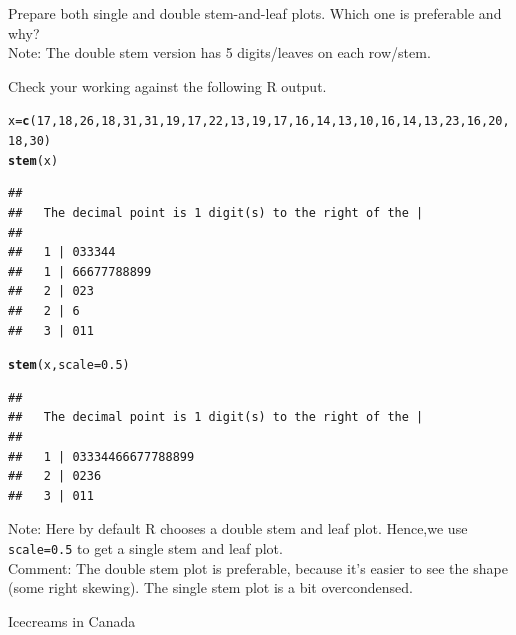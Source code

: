 \documentclass[bigtut]{tutorial}\usepackage[]{graphicx}\usepackage[]{color}
\makeatletter
\newcommand{\hlnum}[1]{\textcolor[rgb]{0.686,0.059,0.569}{#1}}%
\newcommand{\hlstd}[1]{\textcolor[rgb]{0.345,0.345,0.345}{#1}}%
\newcommand{\hlkwb}[1]{\textcolor[rgb]{0.69,0.353,0.396}{#1}}%
\newcommand{\hlkwc}[1]{\textcolor[rgb]{0.333,0.667,0.333}{#1}}%
\newcommand{\hlkwd}[1]{\textcolor[rgb]{0.737,0.353,0.396}{\textbf{#1}}}%
\newenvironment{kframe}{%
 \def\at@end@of@kframe{}%
 \ifinner\ifhmode%
  \def\at@end@of@kframe{\end{minipage}}%
  \begin{minipage}{\columnwidth}%
 \fi\fi%
 \def\FrameCommand##1{\hskip\@totalleftmargin \hskip-\fboxsep
 \colorbox{shadecolor}{##1}\hskip-\fboxsep
     \hskip-\linewidth \hskip-\@totalleftmargin \hskip\columnwidth}%
 \MakeFramed {\advance\hsize-\width
   \@totalleftmargin\z@ \linewidth\hsize
   \@setminipage}}%
 {\par\unskip\endMakeFramed%
 \at@end@of@kframe}
\newenvironment{knitrout}{}{} %
\makeatother
\begin{document}
\begin{tutorial}
\begin{questions}
Prepare both single and double stem-and-leaf plots. Which one is preferable and why? \\

Note: The double stem version has 5 digits/leaves on each row/stem. 




\begin{solution}
Check your working against the following R output.
\begin{knitrout}
\color{fgcolor}\begin{kframe}
\begin{alltt}
\hlstd{x}\hlkwb{=}\hlkwd{c}\hlstd{(}\hlnum{17}\hlstd{,}\hlnum{18}\hlstd{,}\hlnum{26}\hlstd{,}\hlnum{18}\hlstd{,}\hlnum{31}\hlstd{,}\hlnum{31}\hlstd{,}\hlnum{19}\hlstd{,}\hlnum{17}\hlstd{,}\hlnum{22}\hlstd{,}\hlnum{13}\hlstd{,}\hlnum{19}\hlstd{,}\hlnum{17}\hlstd{,}\hlnum{16}\hlstd{,}\hlnum{14}\hlstd{,}\hlnum{13}\hlstd{,}\hlnum{10}\hlstd{,}\hlnum{16}\hlstd{,}\hlnum{14}\hlstd{,}\hlnum{13}\hlstd{,}\hlnum{23}\hlstd{,}\hlnum{16}\hlstd{,}\hlnum{20}\hlstd{,}\hlnum{18}\hlstd{,}\hlnum{30}\hlstd{)}
\hlkwd{stem}\hlstd{(x)}
\end{alltt}
\begin{verbatim}
## 
##   The decimal point is 1 digit(s) to the right of the |
## 
##   1 | 033344
##   1 | 66677788899
##   2 | 023
##   2 | 6
##   3 | 011
\end{verbatim}
\begin{alltt}
\hlkwd{stem}\hlstd{(x,}\hlkwc{scale}\hlstd{=}\hlnum{0.5}\hlstd{)}
\end{alltt}
\begin{verbatim}
## 
##   The decimal point is 1 digit(s) to the right of the |
## 
##   1 | 03334466677788899
##   2 | 0236
##   3 | 011
\end{verbatim}
\end{kframe}
\end{knitrout}
  
Note: Here by default R chooses a double stem and leaf plot. Hence,we use \texttt{scale=0.5} to get a single stem and leaf plot. \\

Comment: The double stem plot is preferable, because it's easier to see the shape (some right skewing). The single stem plot is a bit overcondensed.
\end{solution}


\question Icecreams in Canada \\


\end{questions}
\end{tutorial}
\end{document}
